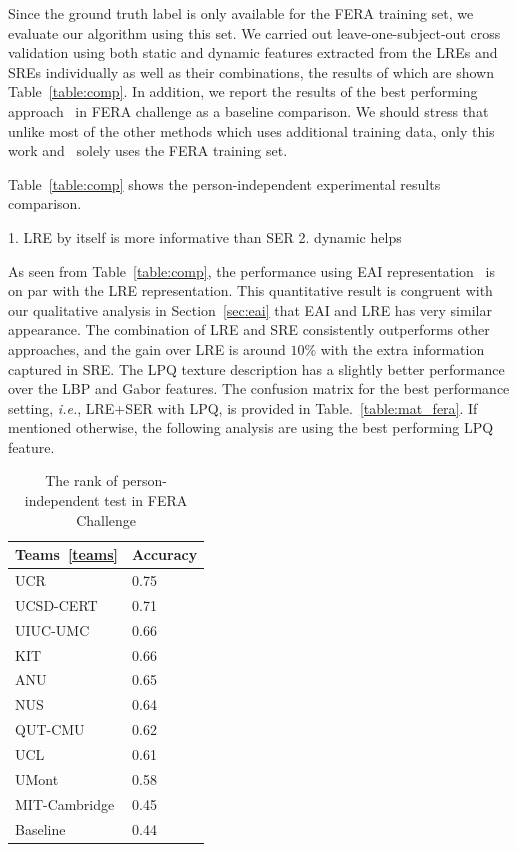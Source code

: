 \documentclass[journal]{IEEEtran}
\begin{document}
Since the ground truth label is only available for the FERA training set, we evaluate our algorithm using this set. We carried out leave-one-subject-out cross validation using both static and dynamic features extracted from the LREs and SREs individually as well as their combinations, the results of which are shown Table~\ref{table:comp}. In addition, we report the results of the best performing approach~\cite{Yang_SMCB12} in FERA challenge as a baseline comparison. We should stress that unlike most of the other methods which uses additional training data, only this work and~\cite{Yang_SMCB12} solely uses the FERA training set. 


Table~\ref{table:comp} shows the person-independent experimental results comparison. 

1. LRE by itself is more informative than SER
2. dynamic helps



As seen from Table~\ref{table:comp}, the performance using EAI representation~\cite{Yang_SMCB12} is on par with the LRE representation. This quantitative result is congruent with our qualitative analysis in Section~\ref{sec:eai} that EAI and LRE has very similar appearance. The combination of LRE and SRE consistently outperforms other approaches, and the gain over LRE is around $10\%$ with the extra information captured in SRE. The LPQ texture description has a slightly better performance over the LBP and \textcolor[rgb]{1,0,0}{Gabor} features. The confusion matrix for the best performance setting, \textit{i.e.}, LRE+SER with LPQ, is provided in Table.~\ref{table:mat_fera}. If mentioned otherwise, the following analysis are using the best performing LPQ feature. 

\begin{table}
\caption{The rank of person-independent test in FERA Challenge\label{table:fera_team}}
\centering
\begin{tabular}{ll}
\toprule
	Teams~\ref{teams} & Accuracy \\ \midrule
	UCR 								& 0.75 \\ 
	UCSD-CERT						& 0.71 \\ 
	UIUC-UMC						& 0.66 \\ 
	KIT									& 0.66 \\ 
	ANU									& 0.65 \\ 
	NUS									& 0.64 \\ 
	QUT-CMU							& 0.62 \\ 
	UCL									& 0.61 \\ 
	UMont								& 0.58 \\ 
	MIT-Cambridge				& 0.45 \\ 
	Baseline						& 0.44 \\
\bottomrule
\end{tabular}
\end{table}
\end{document}
